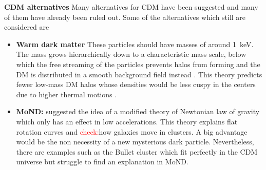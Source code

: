 \textbf{\ac{CDM} alternatives} Many alternatives for \ac{CDM} have been suggested and many of them have already been ruled out. Some of the alternatives which still are considered are 
\begin{itemize}
    \item \textbf{Warm dark matter} These particles should have masses of around \SI{1}{keV}. The mass grows hierarchically down to a characteristic mass scale, below which the free streaming of the particles prevents halos from forming and the \ac{DM} is distributed in a smooth background field instead \citep{Smith...WDM..2011, Schneider...WDM...2013}. This theory predicts fewer low-mass \ac{DM} halos whose densities would be less cuspy in the centers due to higher thermal motions \citep{Bode...WDM...2001}.
    \item \textbf{\ac{MoND}:} \cite{Milgrom...MoND...1983} suggested the idea of a modified theory of Newtonian law of gravity which only has an effect in low accelerations. This theory explains flat rotation curves and \textcolor{red}{check:}how galaxies move in clusters. A big advantage would be the non necessity of a new mysterious dark particle. Nevertheless, there are examples such as the Bullet cluster \citep{Clowe...Bullett...2006} which fit perfectly in the \ac{CDM} universe but struggle to find an explanation in \ac{MoND}.
\end{itemize}

